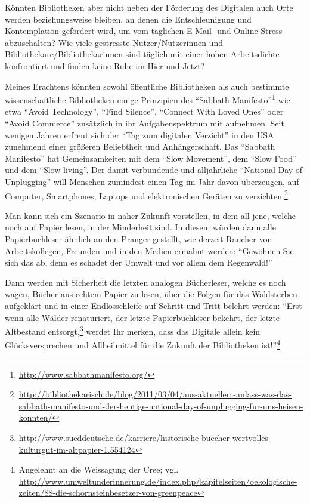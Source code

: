 \documentclass[a4paper,
fontsize=11pt,
oneside,
numbers=noperiodatend,
parskip=half-,
bibliography=totoc,
final
]{scrartcl}
\begin{document}
Könnten Bibliotheken aber nicht neben der Förderung des Digitalen auch
Orte werden beziehungsweise bleiben, an denen die Entschleunigung und
Kontemplation gefördert wird, um vom täglichen E-Mail- und Online-Stress
abzuschalten? Wie viele gestresste Nutzer/Nutzerinnen und
Bibliothekare/Bibliothekarinnen sind täglich mit einer hohen
Arbeitsdichte konfrontiert und finden keine Ruhe im Hier und Jetzt?

Meines Erachtens könnten sowohl öffentliche Bibliotheken als auch
bestimmte wissenschaftliche Bibliotheken einige Prinzipien des
\enquote{Sabbath Manifesto}\footnote{\url{http://www.sabbathmanifesto.org/}}
wie etwa \enquote{Avoid Technology}, \enquote{Find Silence},
\enquote{Connect With Loved Ones} oder \enquote{Avoid Commerce}
zusätzlich in ihr Aufgabenspektrum mit aufnehmen. Seit wenigen Jahren
erfreut sich der \enquote{Tag zum digitalen Verzicht} in den USA
zunehmend einer größeren Beliebtheit und Anhängerschaft. Das
\enquote{Sabbath Manifesto} hat Gemeinsamkeiten mit dem \enquote{Slow
Movement}, dem \enquote{Slow Food} und dem \enquote{Slow living}. Der
damit verbundende und alljährliche \enquote{National Day of Unplugging}
will Menschen zumindest einen Tag im Jahr davon überzeugen, auf
Computer, Smartphones, Laptops und elektronischen Geräten zu
verzichten.\footnote{\url{http://bibliothekarisch.de/blog/2011/03/04/aus-aktuellem-anlass-was-das-sabbath-manifesto-und-der-heutige-national-day-of-unplugging-fur-uns-heisen-konnten/}}

Man kann sich ein Szenario in naher Zukunft vorstellen, in dem all jene,
welche noch auf Papier lesen, in der Minderheit sind. In diesem würden
dann alle Papierbuchleser ähnlich an den Pranger gestellt, wie derzeit
Raucher von Arbeitskollegen, Freunden und in den Medien ermahnt werden:
\enquote{Gewöhnen Sie sich das ab, denn es schadet der Umwelt und vor
allem dem Regenwald!}

Dann werden mit Sicherheit die letzten analogen Bücherleser, welche es
noch wagen, Bücher aus echtem Papier zu lesen, über die Folgen für das
Waldsterben aufgeklärt und in einer Endlosschleife auf Schritt und Tritt
belehrt werden: \enquote{Erst wenn alle Wälder renaturiert, der letzte
Papierbuchleser bekehrt, der letzte Altbestand entsorgt,\footnote{\url{http://www.sueddeutsche.de/karriere/historische-buecher-wertvolles-kulturgut-im-altpapier-1.554124}}
werdet Ihr merken, dass das Digitale allein kein Glücksversprechen und
Allheilmittel für die Zukunft der Bibliotheken ist!}\footnote{Angelehnt
  an die Weissagung der Cree; vgl.
  \url{http://www.umweltunderinnerung.de/index.php/kapitelseiten/oekologische-zeiten/88-die-schornsteinbesetzer-von-greenpeace}}
\end{document}
